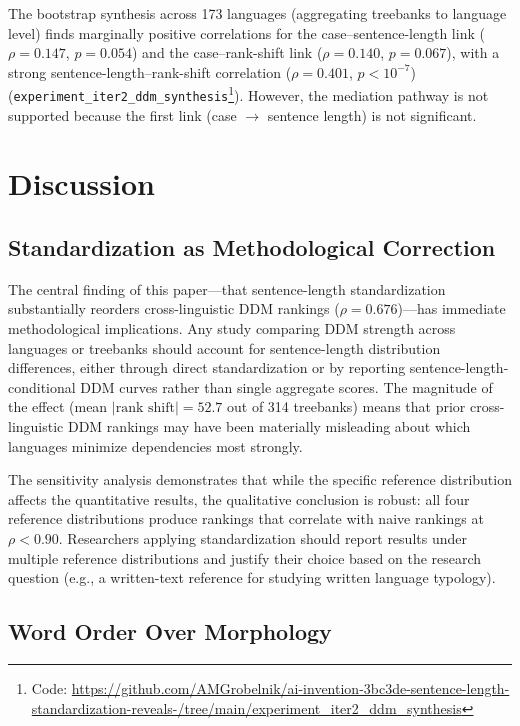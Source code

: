 \documentclass[11pt,letterpaper]{article}
\begin{document}
The bootstrap synthesis across 173 languages (aggregating treebanks to language level) finds marginally positive correlations for the case--sentence-length link ($\rho = 0.147$, $p = 0.054$) and the case--rank-shift link ($\rho = 0.140$, $p = 0.067$), with a strong sentence-length--rank-shift correlation ($\rho = 0.401$, $p < 10^{-7}$) (\texttt{experiment\_iter2\_ddm\_synthesis}\footnote{Code: \url{https://github.com/AMGrobelnik/ai-invention-3bc3de-sentence-length-standardization-reveals-/tree/main/experiment_iter2_ddm_synthesis}}). However, the mediation pathway is not supported because the first link (case $\rightarrow$ sentence length) is not significant.

\section{Discussion}

\subsection{Standardization as Methodological Correction}

The central finding of this paper---that sentence-length standardization substantially reorders cross-linguistic DDM rankings ($\rho = 0.676$)---has immediate methodological implications. Any study comparing DDM strength across languages or treebanks should account for sentence-length distribution differences, either through direct standardization or by reporting sentence-length-conditional DDM curves rather than single aggregate scores. The magnitude of the effect (mean $|\text{rank shift}| = 52.7$ out of 314 treebanks) means that prior cross-linguistic DDM rankings may have been materially misleading about which languages minimize dependencies most strongly.

The sensitivity analysis demonstrates that while the specific reference distribution affects the quantitative results, the qualitative conclusion is robust: all four reference distributions produce rankings that correlate with naive rankings at $\rho < 0.90$. Researchers applying standardization should report results under multiple reference distributions and justify their choice based on the research question (e.g., a written-text reference for studying written language typology).

\subsection{Word Order Over Morphology}
\end{document}

